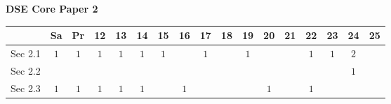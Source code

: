 \documentclass[12pt, a4paper]{article}
\begin{document}
\begin{absolutelynopagebreak}
\begin{center}
\textbf{DSE Core Paper 2}
\end{center}
\begin{center}
\begin{tabular}{|l|c|c|c|c|c|c|c|c|c|c|c|c|c|c|c|c|}
\hline
        & Sa & Pr & 12 & 13 & 14 & 15 & 16 & 17 & 18 & 19 & 20 & 21 & 22 & 23 & 24 & 25 \\\hline\hline
Sec 2.1 &  $1$ &  $1$ &  $1$ &  $1$ &  $1$ &  $1$ &  &  $1$ &  &  $1$ &  &  &  $1$ &  $1$ &  $2$ &  \\\hline
Sec 2.2 &  &  &  &  &  &  &  &  &  &  &  &  &  &  &  $1$ &  \\\hline
Sec 2.3 &  $1$ &  $1$ &  $1$ &  $1$ &  $1$ &  &  $1$ &  &  &  &  $1$ &  &  $1$ &  &  &  \\\hline
\end{tabular}
\end{center}
\end{absolutelynopagebreak}
\end{document}
